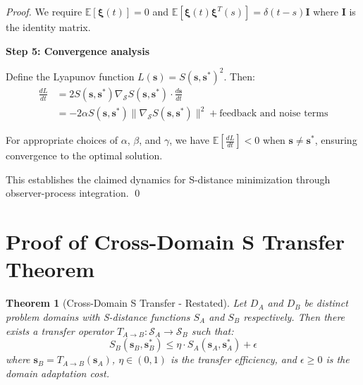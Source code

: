 \documentclass[12pt,a4paper]{article}
\newtheorem{theorem}{Theorem}
\begin{document}
\begin{proof}
We require $\mathbb{E}[\mathbf{\xi}(t)] = 0$ and $\mathbb{E}[\mathbf{\xi}(t) \mathbf{\xi}^T(s)] = \delta(t-s) \mathbf{I}$ where $\mathbf{I}$ is the identity matrix.

\textbf{Step 5: Convergence analysis}

Define the Lyapunov function $L(\mathbf{s}) = S(\mathbf{s}, \mathbf{s}^*)^2$. Then:
\begin{align}
\frac{dL}{dt} &= 2S(\mathbf{s}, \mathbf{s}^*) \nabla_{\mathcal{S}} S(\mathbf{s}, \mathbf{s}^*) \cdot \frac{d\mathbf{s}}{dt}\\
&= -2\alpha S(\mathbf{s}, \mathbf{s}^*) \|\nabla_{\mathcal{S}} S(\mathbf{s}, \mathbf{s}^*)\|^2 + \text{feedback and noise terms}
\end{align}

For appropriate choices of $\alpha$, $\beta$, and $\gamma$, we have $\mathbb{E}[\frac{dL}{dt}] < 0$ when $\mathbf{s} \neq \mathbf{s}^*$, ensuring convergence to the optimal solution.

This establishes the claimed dynamics for S-distance minimization through observer-process integration. \qed
\end{proof}

\section{Proof of Cross-Domain S Transfer Theorem}
\label{proof:cross_domain}

\begin{theorem}[Cross-Domain S Transfer - Restated]
Let $D_A$ and $D_B$ be distinct problem domains with S-distance functions $S_A$ and $S_B$ respectively. Then there exists a transfer operator $T_{A \to B}: \mathcal{S}_A \to \mathcal{S}_B$ such that:
\begin{equation}
S_B(\mathbf{s}_B, \mathbf{s}_B^*) \leq \eta \cdot S_A(\mathbf{s}_A, \mathbf{s}_A^*) + \epsilon
\end{equation}
where $\mathbf{s}_B = T_{A \to B}(\mathbf{s}_A)$, $\eta \in (0, 1)$ is the transfer efficiency, and $\epsilon \geq 0$ is the domain adaptation cost.
\end{theorem}
\end{document}
